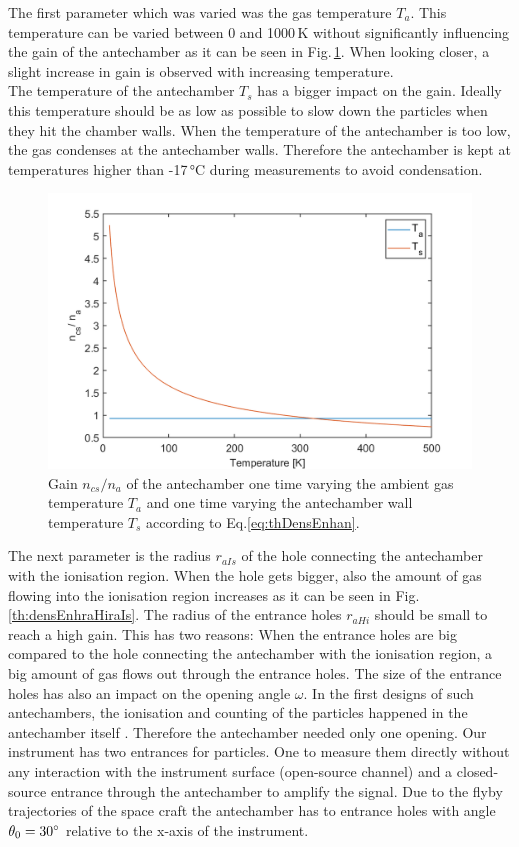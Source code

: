 		The first parameter which was varied was the gas temperature $T_a$. This temperature can be varied between 0 and 1000\,\si{\kelvin} without significantly influencing the gain of the antechamber as it can be seen in Fig.\,\ref{th:densEnhTaTs}. When looking closer, a slight increase in gain is observed with increasing temperature.\\
		The temperature of the antechamber $T_s$ has a bigger impact on the gain. Ideally this temperature should be as low as possible to slow down the particles when they hit the chamber walls. When the temperature of the antechamber is too low, the gas condenses at the antechamber walls. Therefore the antechamber is kept at temperatures higher than -17\,\si{\degreeCelsius} during measurements to avoid condensation.\\
		\begin{figure}[h!] %
			\centering
			\includegraphics[width= .7\textwidth]{Bilder/Ta_Ts.png}
			\caption{Gain $n_{cs}/n_a$ of the antechamber one time varying the ambient gas temperature $T_a$ and one time varying the antechamber wall temperature $T_s$ according to Eq.\eqref{eq:thDensEnhan}.}
			\label{th:densEnhTaTs}
		\end{figure}
		The next parameter is the radius $r_{aIs}$ of the hole connecting the antechamber with the ionisation region. When the hole gets bigger, also the amount of gas flowing into the ionisation region increases as it can be seen in Fig.\,\ref{th:densEnhraHiraIs}. The radius of the entrance holes $r_{aHi}$ should be small to reach a high gain. This has two reasons: When the entrance holes are big compared to the hole connecting the antechamber with the ionisation region, a big amount of gas flows out through the entrance holes. The size of the entrance holes has also an impact on the opening angle $\omega$. In the first designs of such antechambers, the ionisation and counting of the particles happened in the antechamber itself \cite{Hedin_1964}. Therefore the antechamber needed only one opening. Our instrument has two entrances for particles. One to measure them directly without any interaction with the instrument surface (open-source channel) and a closed-source entrance through the antechamber to amplify the signal. Due to the flyby trajectories of the space craft the antechamber has to entrance holes with angle $\theta_0 = 30^\circ$ relative to the x-axis of the instrument.
